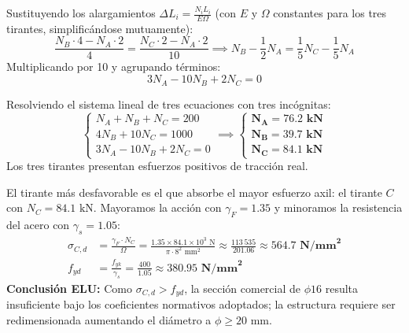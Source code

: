 {    

    Sustituyendo los alargamientos $\Delta L_i = \frac{N_i L_i}{E \Omega}$ (con $E$ y $\Omega$ constantes para los tres tirantes, simplificándose mutuamente):
    \begin{equation}
        \frac{N_B \cdot 4 - N_A \cdot 2}{4} = \frac{N_C \cdot 2 - N_A \cdot 2}{10} \implies N_B - \frac{1}{2} N_A = \frac{1}{5} N_C - \frac{1}{5} N_A
    \end{equation}
    Multiplicando por 10 y agrupando términos:
    \begin{equation}
        3 N_A - 10 N_B + 2 N_C = 0
    \end{equation}

    Resolviendo el sistema lineal de tres ecuaciones con tres incógnitas:
    \begin{equation}
        \begin{cases}
            N_A + N_B + N_C = 200 \\
            4 N_B + 10 N_C = 1000 \\
            3 N_A - 10 N_B + 2 N_C = 0
        \end{cases}
        \implies
        \begin{cases}
            \mathbf{N_A = 76.2\text{ kN}} \\
            \mathbf{N_B = 39.7\text{ kN}} \\
            \mathbf{N_C = 84.1\text{ kN}}
        \end{cases}
    \end{equation}
    Los tres tirantes presentan esfuerzos positivos de tracción real.


    El tirante más desfavorable es el que absorbe el mayor esfuerzo axil: el tirante $C$ con $N_C = 84.1\text{ kN}$.
    Mayoramos la acción con $\gamma_F = 1.35$ y minoramos la resistencia del acero con $\gamma_s = 1.05$:
    \begin{align}
        \sigma_{C,d} & = \frac{\gamma_F \cdot N_C}{\Omega} = \frac{1.35 \times 84.1 \times 10^3\text{ N}}{\pi \cdot 8^2\text{ mm}^2} \approx \frac{113\,535}{201.06} \approx \mathbf{564.7\text{ N/mm}^2} \\
        f_{yd}       & = \frac{f_{yk}}{\gamma_s} = \frac{400}{1.05} \approx \mathbf{380.95\text{ N/mm}^2}
    \end{align}
    \textbf{Conclusión ELU:} Como $\sigma_{C,d} > f_{yd}$, la sección comercial de $\phi 16$ resulta insuficiente bajo los coeficientes normativos adoptados; la estructura requiere ser redimensionada aumentando el diámetro a $\phi \ge 20\text{ mm}$.
}

